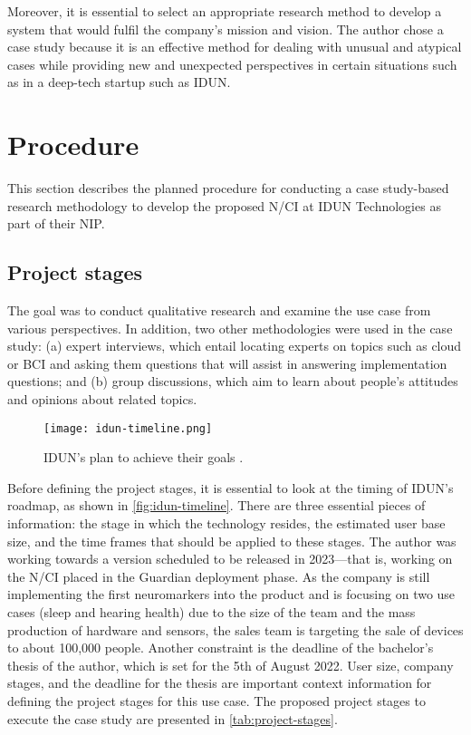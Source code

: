 Moreover, it is essential to select an appropriate research method to develop a system that would fulfil the company’s mission and vision. The author chose a case study because it is an effective method for dealing with unusual and atypical cases while providing new and unexpected perspectives in certain situations such as in a deep-tech startup such as IDUN.

\section{Procedure}
\label{chapter3-procedure}

This section describes the planned procedure for conducting a case study-based research methodology to develop the proposed N/CI at IDUN Technologies as part of their NIP.

\subsection{Project stages}
\label{chapter3-project-stages}

The goal was to conduct qualitative research and examine the use case from various perspectives. In addition, two other methodologies were used in the case study: (a) expert interviews, which entail locating experts on topics such as cloud or BCI and asking them questions that will assist in answering implementation questions; and (b) group discussions, which aim to learn about people’s attitudes and opinions about related topics.

\begin{figure}[!ht]
  \centering
  \texttt{[image: idun-timeline.png]}
  \caption[IDUN’s plan to achieve their goals]{IDUN’s plan to achieve their goals \citep{idun_guardian_nodate}.}
  \label{fig:idun-timeline}
\end{figure}

Before defining the project stages, it is essential to look at the timing of IDUN’s roadmap, as shown in \autoref{fig:idun-timeline}. There are three essential pieces of information: the stage in which the technology resides, the estimated user base size, and the time frames that should be applied to these stages. The author was working towards a version scheduled to be released in 2023—that is, working on the N/CI placed in the Guardian deployment phase. As the company is still implementing the first neuromarkers into the product and is focusing on two use cases (sleep and hearing health) due to the size of the team and the mass production of hardware and sensors, the sales team is targeting the sale of devices to about 100,000 people. Another constraint is the deadline of the bachelor’s thesis of the author, which is set for the 5th of August 2022. User size, company stages, and the deadline for the thesis are important context information for defining the project stages for this use case. The proposed project stages to execute the case study are presented in \autoref{tab:project-stages}.

